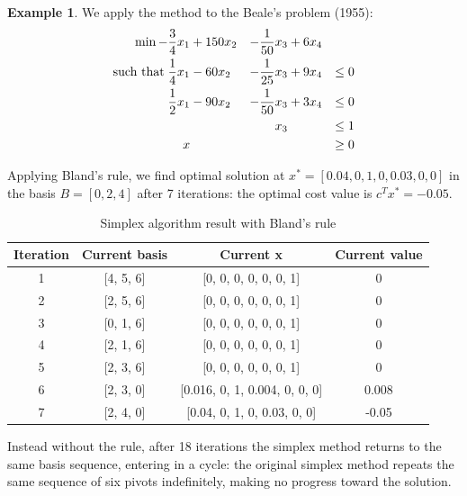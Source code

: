\documentclass[a4paper,10 pt,titlepage,twoside]{book}
\theoremstyle{plain}
\theoremstyle{definition}
\newtheorem{ex}[thm]{Example}
\theoremstyle{remark}
\begin{document}
\begin{ex}
	We apply the method to the Beale's problem (1955): %
	\begin{alignat*}{4}
	\min -\frac{3}{4}x_{1}&+150x_{2}&-\frac{1}{50}x_{3}&+6x_{4}&\\
	\text{such that\;}\frac{1}{4}x_{1}&-60x_{2}&-\frac{1}{25}x_{3}&+9x_{4}&\leq 0\\
	\frac{1}{2}x_{1}&-90x_{2}&-\frac{1}{50}x_{3}&+3x_{4}&\leq 0\\
	&\;&x_{3}&\;&\leq 1\\
	x&\;&\;&\;&\geq 0\\
	\end{alignat*}
	
Applying Bland's rule, we find optimal solution at $x^{*} = [0.04, 0,  1,   0,  0.03, 0,   0  ]$ in the basis $B = [0, 2, 4]$ after 7 iterations: the optimal cost value is $c^{T}x^{*} = -0.05$.\\

\begin{table}[h]
	\begin{center}
	\begin{tabular}{|c|c|c|c|}
		\hline
		\textbf{Iteration} & \textbf{Current basis} & \textbf{Current x} & \textbf{Current value} \\ \hline
		1 & [4, 5, 6] & [0, 0, 0, 0, 0, 0, 1] & 0 \\ \hline
		2 & [2, 5, 6] & [0, 0, 0, 0, 0, 0, 1] & 0 \\ \hline
		3 & [0, 1, 6] & [0, 0, 0, 0, 0, 0, 1] & 0 \\ \hline
		4 & [2, 1, 6] & [0, 0, 0, 0, 0, 0, 1] & 0 \\ \hline
		5 & [2, 3, 6] & [0, 0, 0, 0, 0, 0, 1] & 0 \\ \hline
		6 & [2, 3, 0] & [0.016, 0, 1, 0.004, 0, 0, 0] & 0.008 \\ \hline
		7 & [2, 4, 0] & [0.04, 0, 1, 0, 0.03, 0, 0] & -0.05 \\ \hline
	\end{tabular}\caption{Simplex algorithm result with Bland's rule}
\end{center}
\end{table}

Instead without the rule, after 18 iterations the simplex method returns to the same basis sequence, entering in a cycle: the original simplex method repeats the same sequence of six pivots indefinitely, making no progress toward the solution.


\end{ex}
\end{document}
